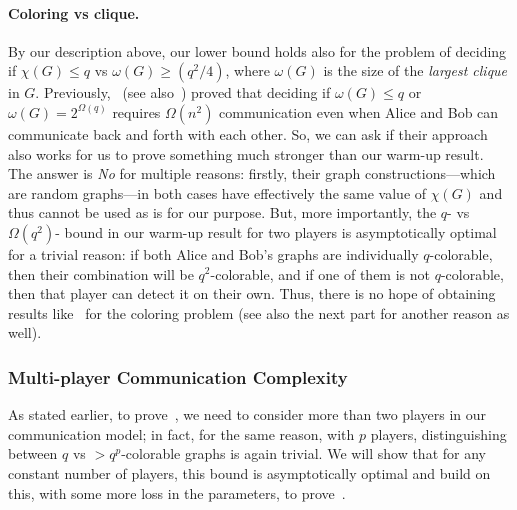 \documentclass[11pt]{article}
\theoremstyle{definition}
\renewcommand{\leq}{\leqslant}
\renewcommand{\geq}{\geqslant}
\begin{document}
\paragraph{Coloring vs clique.} By our description above, our lower bound holds also for the problem of deciding if $\chi(G) \leq q$ vs $\omega(G) \geq (q^2/4)$, where $\omega(G)$ is the size of the \emph{largest clique} in $G$. Previously,~\cite{HalldorssonSSW12} (see also~\cite{RashtchianW0Z21}) proved that deciding if $\omega(G) \leq q$ or $\omega(G) = 2^{\Omega(q)}$ requires $\Omega(n^2)$ communication even when Alice and Bob can communicate back and forth with each other. 
So, we can ask if their approach also works for us to prove something much stronger than our warm-up result. The answer is \emph{No} for multiple reasons: firstly, their graph constructions---which are random graphs---in both cases have effectively the same value of $\chi(G)$
and thus cannot be used as is for our purpose. But, more importantly, the $q$- vs $\Omega(q^2)$- bound in our warm-up result for two players is asymptotically optimal for a trivial reason: if both Alice and Bob's graphs are individually $q$-colorable, then their combination
will be $q^2$-colorable, and if one of them is not $q$-colorable, then that player can detect it on their own. Thus, there is no hope of obtaining results like~\cite{HalldorssonSSW12,RashtchianW0Z21} for the coloring problem (see also the next part for another reason as well). 


\subsubsection{Multi-player Communication Complexity}

As stated earlier, to prove~, we need to consider more than two players in our communication model; in fact, for the same reason, with $p$ players, distinguishing between $q$ vs $>q^p$-colorable graphs is again trivial.  
We will show that for any constant number of players, this bound is asymptotically optimal and build on this, with some more loss in the parameters, to prove~. 
\end{document}
